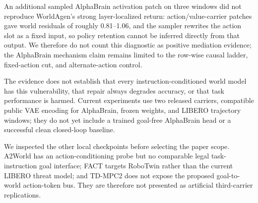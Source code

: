 \documentclass[10pt]{article}
\begin{document}
An additional sampled AlphaBrain activation patch on three windows did not reproduce WorldAgen's strong layer-localized return: action/value-carrier patches gave world residuals of roughly 0.81--1.06, and the sampler rewrites the action slot as a fixed input, so policy retention cannot be inferred directly from that output. We therefore do not count this diagnostic as positive mediation evidence; the AlphaBrain mechanism claim remains limited to the row-wise causal ladder, fixed-action cut, and alternate-action control.

The evidence does not establish that every instruction-conditioned world model has this vulnerability, that repair always degrades accuracy, or that task performance is harmed. Current experiments use two released carriers, compatible public VAE encoding for AlphaBrain, frozen weights, and LIBERO trajectory windows; they do not yet include a trained goal-free AlphaBrain head or a successful clean closed-loop baseline.

We inspected the other local checkpoints before selecting the paper scope. A2World has an action-conditioning probe but no comparable legal task-instruction goal interface; FACT targets RoboTwin rather than the current LIBERO threat model; and TD-MPC2 does not expose the proposed goal-to-world action-token bus. They are therefore not presented as artificial third-carrier replications.
\end{document}
